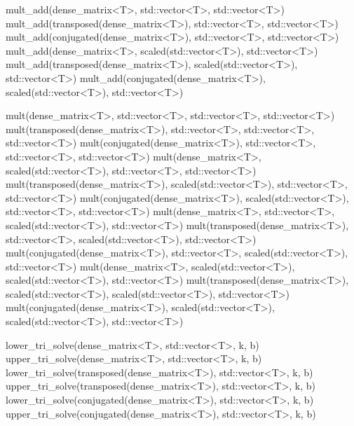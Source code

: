 \documentclass[11pt,a4paper]{article}
\begin{document}
\begin{cppcode}
  mult_add(dense_matrix<T>, std::vector<T>, std::vector<T>)             
  mult_add(transposed(dense_matrix<T>), std::vector<T>, std::vector<T>) 
  mult_add(conjugated(dense_matrix<T>), std::vector<T>, std::vector<T>) 
  mult_add(dense_matrix<T>, scaled(std::vector<T>), std::vector<T>)     
  mult_add(transposed(dense_matrix<T>), scaled(std::vector<T>),         
           std::vector<T>)                                              
  mult_add(conjugated(dense_matrix<T>), scaled(std::vector<T>),         
           std::vector<T>)                                              
                                                                        
  mult(dense_matrix<T>, std::vector<T>, std::vector<T>, std::vector<T>) 
  mult(transposed(dense_matrix<T>), std::vector<T>, std::vector<T>,     
       std::vector<T>)                                                  
  mult(conjugated(dense_matrix<T>), std::vector<T>, std::vector<T>,     
       std::vector<T>)                                                  
  mult(dense_matrix<T>, scaled(std::vector<T>), std::vector<T>,         
       std::vector<T>)                                                  
  mult(transposed(dense_matrix<T>), scaled(std::vector<T>),             
       std::vector<T>, std::vector<T>)                                  
  mult(conjugated(dense_matrix<T>), scaled(std::vector<T>),             
       std::vector<T>, std::vector<T>)                                  
  mult(dense_matrix<T>, std::vector<T>, scaled(std::vector<T>),         
       std::vector<T>)                                                  
  mult(transposed(dense_matrix<T>), std::vector<T>,                     
       scaled(std::vector<T>), std::vector<T>)                          
  mult(conjugated(dense_matrix<T>), std::vector<T>,                     
       scaled(std::vector<T>), std::vector<T>)                          
  mult(dense_matrix<T>, scaled(std::vector<T>), scaled(std::vector<T>), 
    std::vector<T>)                                                     
  mult(transposed(dense_matrix<T>), scaled(std::vector<T>),             
       scaled(std::vector<T>), std::vector<T>)                          
  mult(conjugated(dense_matrix<T>), scaled(std::vector<T>),             
       scaled(std::vector<T>), std::vector<T>)                          
                                                                        
  lower_tri_solve(dense_matrix<T>, std::vector<T>, k, b)                
  upper_tri_solve(dense_matrix<T>, std::vector<T>, k, b)                
  lower_tri_solve(transposed(dense_matrix<T>), std::vector<T>, k, b)    
  upper_tri_solve(transposed(dense_matrix<T>), std::vector<T>, k, b)    
  lower_tri_solve(conjugated(dense_matrix<T>), std::vector<T>, k, b)    
  upper_tri_solve(conjugated(dense_matrix<T>), std::vector<T>, k, b)    
                                                                        

\end{cppcode}
\end{document}
